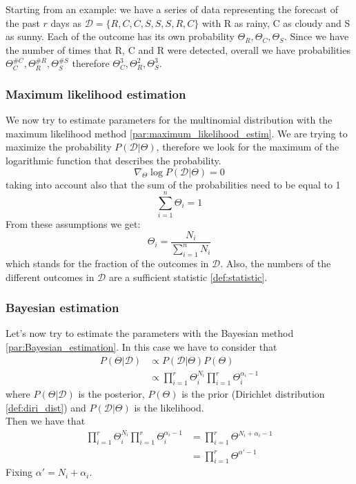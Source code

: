 Starting from an example: we have a series of data representing the forecast of the
past $r$ days as $\mathcal{D}= \{R, C, C, S, S, S, R, C\}$ with R as rainy, C as
cloudy and S as sunny. Each of the outcome has its own probability $\Theta_{R}, \Theta
_{C}, \Theta_{S}$. Since we have the number of times that R, C and R were detected,
overall we have probabilities
$\Theta_{C}^{\#C}, \Theta_{R}^{\#R}, \Theta_{S}^{\#S}$ therefore
$\Theta_{C}^{3}, \Theta_{R}^{2}, \Theta_{S}^{3}$.

\subsubsection{Maximum likelihood estimation}
We now try to estimate parameters for the multinomial distribution with the
maximum likelihood method \ref{par:maximum_likelihood_estim}. We are trying to maximize
the probability $P(\mathcal{D}|\Theta)$, therefore we look for the maximum of
the logarithmic function that describes the probability.
\[
	\nabla_{\Theta}\log P(\mathcal{D}|\Theta) = 0
\]
taking into account also that the sum of the probabilities need to be equal to 1
\[
	\sum_{i=1}^{n}\Theta_{i}= 1
\]
From these assumptions we get:
\[
	\Theta_{i}= \frac{N_{i}}{\sum_{i=1}^{n}N_{i}}
\]
which stands for the fraction of the outcomes in $\mathcal{D}$. Also, the
numbers of the different outcomes in $\mathcal{D}$ are a sufficient statistic
\ref{def:statistic}.

\subsubsection{Bayesian estimation}
Let's now try to estimate the parameters with the Bayesian method
\ref{par:Bayesian_estimation}. In this case we have to consider that
\begin{align*}
	P(\Theta|\mathcal{D}) & \propto P(\mathcal{D}|\Theta)P(\Theta)                                         \\
	                      & \propto \prod_{i=1}^{r}\Theta_{i}^{N_i}\prod_{i=1}^{r}\Theta_{i}^{\alpha_i -1}
\end{align*}
where $P(\Theta|\mathcal{D})$ is the posterior, $P(\Theta)$ is the prior (Dirichlet
distribution \ref{def:diri_dist}) and $P(\mathcal{D}|\Theta)$ is the likelihood.\\
Then we have that
\begin{align*}
	\prod_{i=1}^{r}\Theta_{i}^{N_i}\prod_{i=1}^{r}\Theta_{i}^{\alpha_i -1} & = \prod_{i=1}^{r}\Theta^{N_i + \alpha_i -1} \\
	                                                                       & = \prod_{i=1}^{r}\Theta^{\alpha' -1}
\end{align*}
Fixing $\alpha' = N_{i}+ \alpha_{i}$.\\

